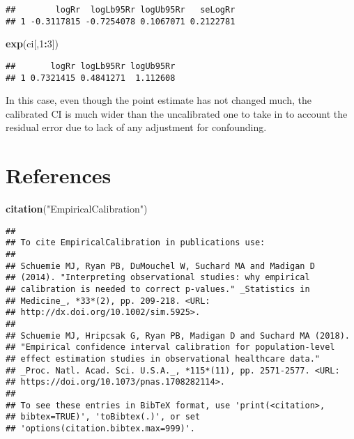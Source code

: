 \documentclass[]{article}
\newenvironment{Shaded}{\begin{snugshade}}{\end{snugshade}}
\newcommand{\DecValTok}[1]{\textcolor[rgb]{0.00,0.00,0.81}{#1}}
\newcommand{\KeywordTok}[1]{\textcolor[rgb]{0.13,0.29,0.53}{\textbf{#1}}}
\newcommand{\NormalTok}[1]{#1}
\newcommand{\OperatorTok}[1]{\textcolor[rgb]{0.81,0.36,0.00}{\textbf{#1}}}
\newcommand{\StringTok}[1]{\textcolor[rgb]{0.31,0.60,0.02}{#1}}
\begin{document}
\begin{Shaded}
\end{Shaded}

\begin{verbatim}
##        logRr  logLb95Rr logUb95Rr   seLogRr
## 1 -0.3117815 -0.7254078 0.1067071 0.2122781
\end{verbatim}

\begin{Shaded}
\begin{Highlighting}[]
\KeywordTok{exp}\NormalTok{(ci[,}\DecValTok{1}\OperatorTok{:}\DecValTok{3}\NormalTok{])}
\end{Highlighting}
\end{Shaded}

\begin{verbatim}
##       logRr logLb95Rr logUb95Rr
## 1 0.7321415 0.4841271  1.112608
\end{verbatim}

In this case, even though the point estimate has not changed much, the
calibrated CI is much wider than the uncalibrated one to take in to
account the residual error due to lack of any adjustment for
confounding.

\hypertarget{references}{%
\section{References}\label{references}}

\begin{Shaded}
\begin{Highlighting}[]
\KeywordTok{citation}\NormalTok{(}\StringTok{"EmpiricalCalibration"}\NormalTok{)}
\end{Highlighting}
\end{Shaded}

\begin{verbatim}
## 
## To cite EmpiricalCalibration in publications use:
## 
## Schuemie MJ, Ryan PB, DuMouchel W, Suchard MA and Madigan D
## (2014). "Interpreting observational studies: why empirical
## calibration is needed to correct p-values." _Statistics in
## Medicine_, *33*(2), pp. 209-218. <URL:
## http://dx.doi.org/10.1002/sim.5925>.
## 
## Schuemie MJ, Hripcsak G, Ryan PB, Madigan D and Suchard MA (2018).
## "Empirical confidence interval calibration for population-level
## effect estimation studies in observational healthcare data."
## _Proc. Natl. Acad. Sci. U.S.A._, *115*(11), pp. 2571-2577. <URL:
## https://doi.org/10.1073/pnas.1708282114>.
## 
## To see these entries in BibTeX format, use 'print(<citation>,
## bibtex=TRUE)', 'toBibtex(.)', or set
## 'options(citation.bibtex.max=999)'.
\end{verbatim}
\end{document}
